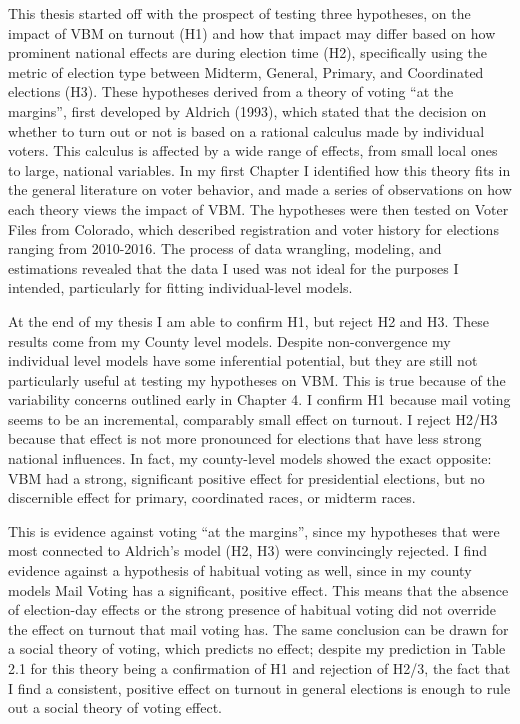 \documentclass[12pt,twoside]{reedthesis}
\begin{document}
  \setcounter{chapter}{5} \setcounter{section}{0}
  
  This thesis started off with the prospect of testing three hypotheses,
  on the impact of VBM on turnout (H1) and how that impact may differ
  based on how prominent national effects are during election time (H2),
  specifically using the metric of election type between Midterm, General,
  Primary, and Coordinated elections (H3). These hypotheses derived from a
  theory of voting ``at the margins'', first developed by Aldrich (1993),
  which stated that the decision on whether to turn out or not is based on
  a rational calculus made by individual voters. This calculus is affected
  by a wide range of effects, from small local ones to large, national
  variables. In my first Chapter I identified how this theory fits in the
  general literature on voter behavior, and made a series of observations
  on how each theory views the impact of VBM. The hypotheses were then
  tested on Voter Files from Colorado, which described registration and
  voter history for elections ranging from 2010-2016. The process of data
  wrangling, modeling, and estimations revealed that the data I used was
  not ideal for the purposes I intended, particularly for fitting
  individual-level models.
  
  At the end of my thesis I am able to confirm H1, but reject H2 and H3.
  These results come from my County level models. Despite non-convergence
  my individual level models have some inferential potential, but they are
  still not particularly useful at testing my hypotheses on VBM. This is
  true because of the variability concerns outlined early in Chapter 4. I
  confirm H1 because mail voting seems to be an incremental, comparably
  small effect on turnout. I reject H2/H3 because that effect is not more
  pronounced for elections that have less strong national influences. In
  fact, my county-level models showed the exact opposite: VBM had a
  strong, significant positive effect for presidential elections, but no
  discernible effect for primary, coordinated races, or midterm races.
  
  This is evidence against voting ``at the margins'', since my hypotheses
  that were most connected to Aldrich's model (H2, H3) were convincingly
  rejected. I find evidence against a hypothesis of habitual voting as
  well, since in my county models Mail Voting has a significant, positive
  effect. This means that the absence of election-day effects or the
  strong presence of habitual voting did not override the effect on
  turnout that mail voting has. The same conclusion can be drawn for a
  social theory of voting, which predicts no effect; despite my prediction
  in Table 2.1 for this theory being a confirmation of H1 and rejection of
  H2/3, the fact that I find a consistent, positive effect on turnout in
  general elections is enough to rule out a social theory of voting
  effect.
  
\end{document}
